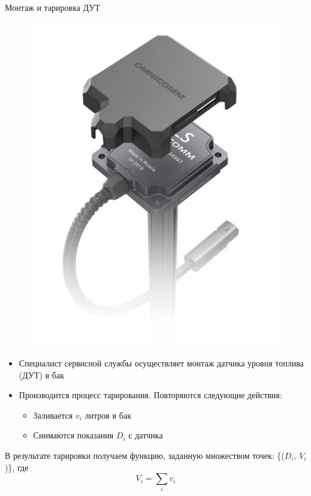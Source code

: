 \documentclass[usenames,dvipsnames,11pt]{beamer}
\begin{document}
\begin{frame}{Монтаж и тарировка ДУТ}
	\begin{minipage}[h]{0.39\linewidth}
		\begin{figure}
		\centering
		\includegraphics[width=1\linewidth]{graphics/screenshot002}
		\end{figure}
	\end{minipage}
	\hfill
	\begin{minipage}[h]{0.59\linewidth}
		\begin{itemize}
			\item Специалист сервисной службы осуществляет монтаж датчика уровня топлива (ДУТ) в бак
			\item Производится процесс тарирования. Повторяются следующие действия:
			\begin{itemize}
			\item Заливается $v_i$ литров в бак
			\item Снимаются показания $D_i$ с датчика
			\end{itemize}
		\end{itemize}
		В результате тарировки получаем функцию, заданную множеством точек:
		\{($D_i$, $V_i$)\},
		где $$V_i = \sum_{i}v_i$$
	\end{minipage}
\end{frame}
\end{document}
